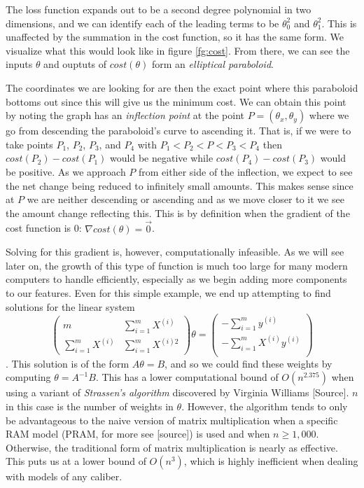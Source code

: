The loss function expands out to be a second degree polynomial in two
dimensions, and we can identify each of the leading terms to be $\theta_0^2$ and
$\theta_1^2$. This is unaffected by the summation in the cost function, so it
has the same form. We visualize what this would look like in figure
\ref{fg:cost}. From there, we can see the inputs $\theta$ and ouptuts of
$cost(\theta)$ form an \emph{elliptical paraboloid}.

The coordinates we are looking for are then the exact point where this
paraboloid bottoms out since this will give us the minimum cost. We can obtain
this point by noting the graph has an \emph{inflection point} at the point $P =
(\theta_x, \theta_y)$ where we go from descending the paraboloid's curve to
ascending it. That is, if we were to take points $P_1$, $P_2$, $P_3$, and $P_4$
with $P_1 < P_2 < P < P_3 < P_4$ then $cost(P_2) - cost(P_1)$ would be negative
while $cost(P_4) - cost(P_3)$ would be positive. As we approach $P$ from either
side of the inflection, we expect to see the net change being 
reduced to infinitely small amounts. This makes sense since at
$P$ we are neither descending or ascending and as we move closer to it we see
the amount change reflecting this. This is by definition when the gradient of
the cost function is 0: $\nabla cost(\theta) = \vec{0}$.

Solving for this gradient is, however, computationally infeasible. As we will
see later on, the growth of this type of function is much too large for many
modern computers to handle efficiently, especially as we begin adding more
components to our features. Even for this simple example, we end up attempting
to find solutions for the linear system
\begin{equation*}
    \begin{pmatrix}
        m & \sum_{i=1}^{m}X^{(i)} \\[6pt] 
        \sum_{i=1}^{m}X^{(i)} & \sum_{i=1}^{m}X^{(i)2}
    \end{pmatrix}
    \theta
    =
    \begin{pmatrix}
        -\sum_{i=1}^{m}y^{(i)} \\[6pt]
        -\sum_{i=1}^{m}X^{(i)}y^{(i)} \\
    \end{pmatrix}
\end{equation*}
. This solution is of the form $A\theta = B$, and so we could find these weights
by computing $\theta =A^{-1}B$. This has a lower computational bound of
$O(n^{2.375})$ when using a variant of \emph{Strassen's algorithm} discovered by
Virginia Williams [Source]. $n$ in this case is the number of weights in
$\theta$. However, the algorithm tends to only be advantageous to the naive
version of matrix multiplication when a specific RAM model (PRAM, for more see
[source]) is used and when $n \geq 1,000$. Otherwise, the traditional form of
matrix multiplication is nearly as effective. This puts us at a lower bound of
$O(n^3)$, which is highly inefficient when dealing with models of any caliber.

